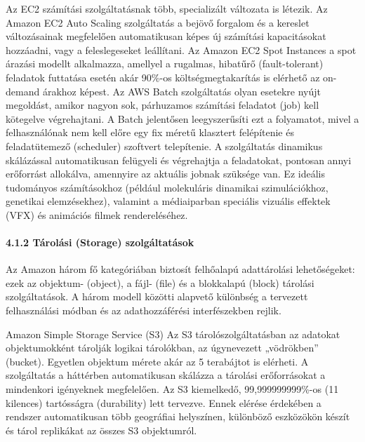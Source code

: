 \documentclass[
]{article}
\begin{document}
Az EC2 számítási szolgáltatásnak több, specializált változata is
létezik. Az Amazon EC2 Auto Scaling szolgáltatás a bejövő forgalom és a
kereslet változásainak megfelelően automatikusan képes új számítási
kapacitásokat hozzáadni, vagy a feleslegeseket leállítani. Az Amazon EC2
Spot Instances a spot árazási modellt alkalmazza, amellyel a rugalmas,
hibatűrő (fault-tolerant) feladatok futtatása esetén akár 90\%-os
költségmegtakarítás is elérhető az on-demand árakhoz képest. Az AWS
Batch szolgáltatás olyan esetekre nyújt megoldást, amikor nagyon sok,
párhuzamos számítási feladatot (job) kell kötegelve végrehajtani. A
Batch jelentősen leegyszerűsíti ezt a folyamatot, mivel a felhasználónak
nem kell előre egy fix méretű klasztert felépítenie és feladatütemező
(scheduler) szoftvert telepítenie. A szolgáltatás dinamikus skálázással
automatikusan felügyeli és végrehajtja a feladatokat, pontosan annyi
erőforrást allokálva, amennyire az aktuális jobnak szüksége van. Ez
ideális tudományos számításokhoz (például molekuláris dinamikai
szimulációkhoz, genetikai elemzésekhez), valamint a médiaiparban
speciális vizuális effektek (VFX) és animációs filmek rendereléséhez.

\hypertarget{tuxe1roluxe1si-storage-szolguxe1ltatuxe1sok}{%
\paragraph{4.1.2 Tárolási (Storage)
szolgáltatások}\label{tuxe1roluxe1si-storage-szolguxe1ltatuxe1sok}}

Az Amazon három fő kategóriában biztosít felhőalapú adattárolási
lehetőségeket: ezek az objektum- (object), a fájl- (file) és a
blokkalapú (block) tárolási szolgáltatások. A három modell közötti
alapvető különbség a tervezett felhasználási módban és az
adathozzáférési interfészekben rejlik.

Amazon Simple Storage Service (S3) Az S3 tárolószolgáltatásban az
adatokat objektumokként tárolják logikai tárolókban, az úgynevezett
„vödrökben'' (bucket). Egyetlen objektum mérete akár az 5 terabájtot is
elérheti. A szolgáltatás a háttérben automatikusan skálázza a tárolási
erőforrásokat a mindenkori igényeknek megfelelően. Az S3 kiemelkedő,
99,999999999\%-os (11 kilences) tartósságra (durability) lett tervezve.
Ennek elérése érdekében a rendszer automatikusan több geográfiai
helyszínen, különböző eszközökön készít és tárol replikákat az összes S3
objektumról.
\end{document}
